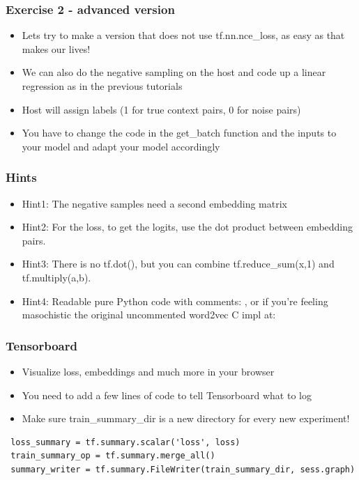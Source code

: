 \documentclass{beamer}
\begin{document}
 \begin{frame}[fragile]

  \frametitle{Exercise 2 - advanced version}
   \begin{itemize}
		\item Lets try to make a version that does not use tf.nn.nce\_loss, as easy as that makes our lives!
		\item We can also do the negative sampling on the host and code up a linear regression as in the previous tutorials
		\item Host will assign labels (1 for true context pairs, 0 for noise pairs)
		\item You have to change the code in the get\_batch function and the inputs to your model and adapt your model accordingly		
	\end{itemize}
\end{frame}

 \begin{frame}[fragile]
 
 \frametitle{Hints}
  \begin{itemize}
		\item Hint1: The negative samples need a second embedding matrix
		\item Hint2: For the loss, to get the logits, use the dot product between embedding pairs.
		\item Hint3: There is no tf.dot(), but you can combine tf.reduce\_sum(x,1) and tf.multiply(a,b).
		\item Hint4: Readable pure Python code with comments: , or if you're feeling masochistic the original uncommented word2vec C impl at: 
	\end{itemize}
		
\end{frame}


 \begin{frame}[fragile]
 
 \frametitle{Tensorboard}
  \begin{itemize}
		\item Visualize loss, embeddings and much more in your browser
		\item You need to add a few lines of code to tell Tensorboard what to log
		\item Make sure train\_summary\_dir is a new directory for every new experiment!
	\end{itemize}
			
	\begin{tiny}
\begin{lstlisting}
 loss_summary = tf.summary.scalar('loss', loss) 
 train_summary_op = tf.summary.merge_all()
 summary_writer = tf.summary.FileWriter(train_summary_dir, sess.graph)
\end{lstlisting}   
\end{tiny}    
	
\end{frame}
\end{document}

